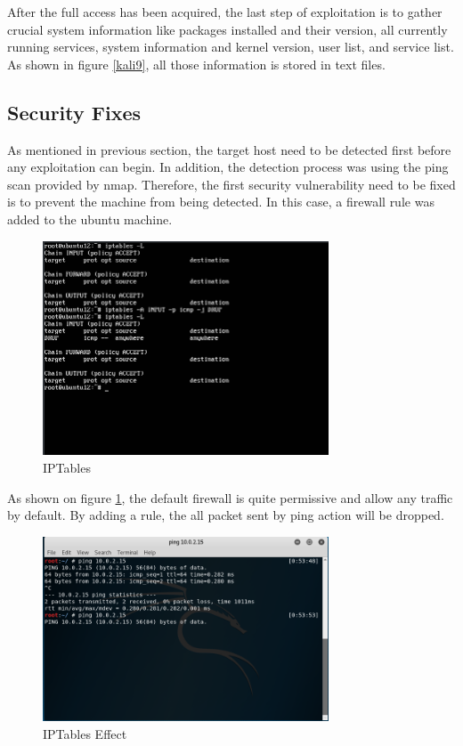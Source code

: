 \documentclass{article}
\begin{document}
After the full access has been acquired, the last step of exploitation is to gather crucial system information 
like packages installed and their version, all currently running services, system information and kernel version, 
user list, and service list.
As shown in figure \ref{kali9}, all those information is stored in text files.


\subsection{Security Fixes}
As mentioned in previous section, the target host need to be detected first before any exploitation can begin.
In addition, the detection process was using the ping scan provided by nmap. Therefore, the first security vulnerability 
need to be fixed is to prevent the machine from being detected. In this case, a firewall rule was added to the ubuntu 
machine.

\begin{figure}[H]
  \includegraphics[width=8.5cm]{ubuntu4}
  \caption{IPTables}
  \label{ubuntu4}
\end{figure}

As shown on figure \ref{ubuntu4}, the default firewall is quite permissive and allow any traffic by default. 
By adding a rule, the all packet sent by ping action will be dropped. 

\begin{figure}[H]
  \includegraphics[width=8.5cm]{kali10}
  \caption{IPTables Effect}
  \label{kali10}
\end{figure}
\end{document}
